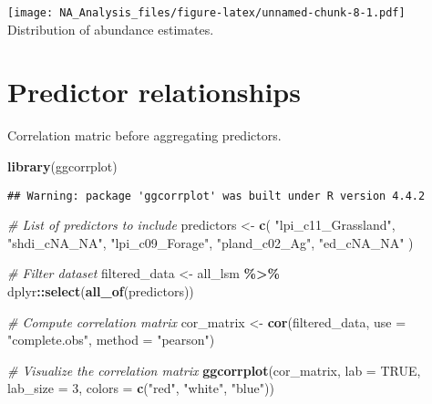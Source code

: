 \documentclass[
]{article}
\newenvironment{Shaded}{\begin{snugshade}}{\end{snugshade}}
\newcommand{\AttributeTok}[1]{\textcolor[rgb]{0.13,0.29,0.53}{#1}}
\newcommand{\CommentTok}[1]{\textcolor[rgb]{0.56,0.35,0.01}{\textit{#1}}}
\newcommand{\ConstantTok}[1]{\textcolor[rgb]{0.56,0.35,0.01}{#1}}
\newcommand{\DecValTok}[1]{\textcolor[rgb]{0.00,0.00,0.81}{#1}}
\newcommand{\FunctionTok}[1]{\textcolor[rgb]{0.13,0.29,0.53}{\textbf{#1}}}
\newcommand{\NormalTok}[1]{#1}
\newcommand{\OtherTok}[1]{\textcolor[rgb]{0.56,0.35,0.01}{#1}}
\newcommand{\SpecialCharTok}[1]{\textcolor[rgb]{0.81,0.36,0.00}{\textbf{#1}}}
\newcommand{\StringTok}[1]{\textcolor[rgb]{0.31,0.60,0.02}{#1}}
\begin{document}
\texttt{[image: NA\_Analysis\_files/figure-latex/unnamed-chunk-8-1.pdf]}
Distribution of abundance estimates.

\section{Predictor relationships}\label{predictor-relationships}

Correlation matric before aggregating predictors.

\begin{Shaded}
\begin{Highlighting}[]
\FunctionTok{library}\NormalTok{(ggcorrplot)}
\end{Highlighting}
\end{Shaded}

\begin{verbatim}
## Warning: package 'ggcorrplot' was built under R version 4.4.2
\end{verbatim}

\begin{Shaded}
\begin{Highlighting}[]
\CommentTok{\# List of predictors to include}
\NormalTok{predictors }\OtherTok{\textless{}{-}} \FunctionTok{c}\NormalTok{(}
   \StringTok{"lpi\_c11\_Grassland"}\NormalTok{, }\StringTok{"shdi\_cNA\_NA"}\NormalTok{, }\StringTok{"lpi\_c09\_Forage"}\NormalTok{, }\StringTok{"pland\_c02\_Ag"}\NormalTok{, }\StringTok{"ed\_cNA\_NA"}
\NormalTok{)}

\CommentTok{\# Filter dataset}
\NormalTok{filtered\_data }\OtherTok{\textless{}{-}}\NormalTok{ all\_lsm }\SpecialCharTok{\%\textgreater{}\%}
\NormalTok{  dplyr}\SpecialCharTok{::}\FunctionTok{select}\NormalTok{(}\FunctionTok{all\_of}\NormalTok{(predictors))}

\CommentTok{\# Compute correlation matrix}
\NormalTok{cor\_matrix }\OtherTok{\textless{}{-}} \FunctionTok{cor}\NormalTok{(filtered\_data, }\AttributeTok{use =} \StringTok{"complete.obs"}\NormalTok{, }\AttributeTok{method =} \StringTok{"pearson"}\NormalTok{)}

\CommentTok{\# Visualize the correlation matrix}
\FunctionTok{ggcorrplot}\NormalTok{(cor\_matrix, }\AttributeTok{lab =} \ConstantTok{TRUE}\NormalTok{, }\AttributeTok{lab\_size =} \DecValTok{3}\NormalTok{, }\AttributeTok{colors =} \FunctionTok{c}\NormalTok{(}\StringTok{"red"}\NormalTok{, }\StringTok{"white"}\NormalTok{, }\StringTok{"blue"}\NormalTok{))}
\end{Highlighting}
\end{Shaded}
\end{document}
